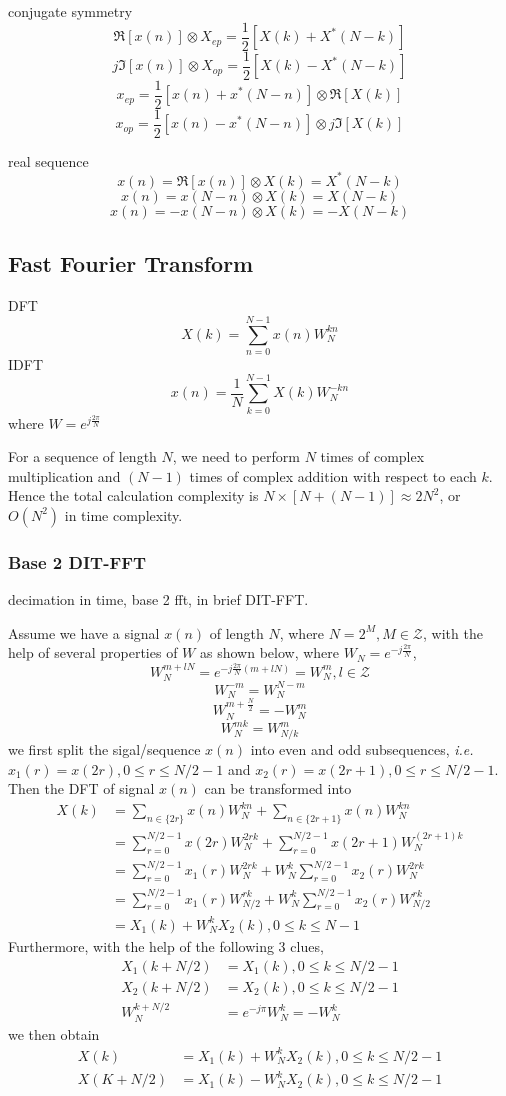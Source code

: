 conjugate symmetry
\[ \Re[x(n)] \otimes X_{ep} = \frac{1}{2} [X(k)+X^*(N-k)]\]
\[ j\Im[x(n)] \otimes X_{op} = \frac{1}{2} [X(k)-X^*(N-k)]\]
\[ x_{ep} = \frac{1}{2} [x(n)+x^*(N-n)] \otimes \Re[X(k)]\]
\[ x_{op} = \frac{1}{2} [x(n)-x^*(N-n)] \otimes j\Im[X(k)]\]

real sequence
\[ x(n) = \Re[x(n)] \otimes X(k) = X^*(N-k) \]
\[ x(n) = x(N-n) \otimes X(k) = X(N-k) \]
\[ x(n) =-x(N-n) \otimes X(k) =-X(N-k) \]

\subsection{Fast Fourier Transform}

DFT
\[ X(k) = \sum_{n=0}^{N-1} x(n)W_N^{kn} \]
IDFT
\[ x(n) = \frac{1}{N} \sum_{k=0}^{N-1} X(k) W_N^{-kn}\]
where $W = e^{j\frac{2\pi}{N}}$

For a sequence of length $N$, we need to perform $N$ times of complex multiplication
and $(N-1)$ times of complex addition with respect to each $k$. Hence the total
calculation complexity is $N\times [N + (N-1)] \approx 2N^2$, or $O(N^2)$ in time complexity.

\subsubsection{Base 2 DIT-FFT}
decimation in time, base 2 fft, in brief DIT-FFT.

Assume we have a signal $x(n)$ of length $N$, where $N=2^M, M\in \mathcal{Z}$,
with the help of several properties of $W$ as shown below, where $W_N = e^{-j\frac{2\pi}{N}}$,
\[ W_N^{m+lN} = e^{-j\frac{2\pi}{N}(m+lN)}= W_N^m , l \in \mathcal{Z}\]
\[ W_N^{-m} = W_N^{N-m} \]
\[ W_N^{m+\frac{N}{2}} = -W_N^m \]
\[ W_N^{mk} = W_{N/k}^m\]
we first split the sigal/sequence $x(n)$ into even and odd subsequences,
{\it i.e.} $x_1(r) = x(2r), 0 \leq r \leq N/2-1$ and $x_2(r) = x(2r+1), 0 \leq r \leq N/2-1$.
Then the DFT of signal $x(n)$ can be transformed into
\begin{align*}
X(k) &= \sum_{n \in \{2r\}} x(n) W_N^{kn} + \sum_{n \in \{2r+1\}} x(n) W_N^{kn}\\
 &= \sum_{r=0}^{N/2-1} x(2r)W_N^{2rk} + \sum_{r=0}^{N/2-1} x(2r+1)W_N^{(2r+1)k}\\
 &= \sum_{r=0}^{N/2-1} x_1(r)W_N^{2rk} + W_N^{k} \sum_{r=0}^{N/2-1} x_2(r)W_N^{2rk}\\
 &= \sum_{r=0}^{N/2-1} x_1(r)W_{N/2}^{rk} + W_N^{k} \sum_{r=0}^{N/2-1} x_2(r)W_{N/2}^{rk}\\
 &= X_1(k) + W_N^k X_2(k), 0 \leq k \leq N-1
\end{align*}
Furthermore, with the help of the following 3 clues,
\begin{align*}
X_1(k+N/2) &= X_1(k), 0\leq k \leq N/2-1 \\
X_2(k+N/2) &= X_2(k), 0\leq k \leq N/2-1 \\
W_N^{k+N/2} & = e^{-j\pi}W_N^k = -W_N^k
\end{align*}
we then obtain
\begin{align*}
X(k) &= X_1(k) + W_N^k X_2(k), 0\leq k \leq N/2-1\\
X(K+N/2) &= X_1(k) - W_N^k X_2(k), 0\leq k \leq N/2-1
\end{align*}

